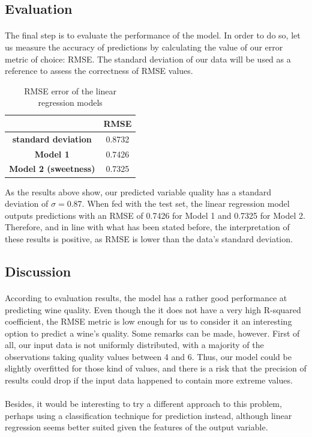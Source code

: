 \documentclass[10pt]{article}
\begin{document}
\subsection{Evaluation}

\paragraph*{}
The final step is to evaluate the performance of the model. In order to do so, let us measure the accuracy of predictions by calculating the value of our error metric of choice: RMSE. The standard deviation of our data will be used as a reference to assess the correctness of RMSE values.

\begin{table}[H]
	\centering
	
	\begin{tabular}{|c|c|}
		\hline
		& \textbf{RMSE} \\ \hline
		\textbf{standard deviation} & 0.8732        \\ \hline
		\textbf{Model 1}            & 0.7426         \\ \hline
		\textbf{Model 2 (sweetness)}            & 0.7325         \\ \hline
	\end{tabular}
	\caption{RMSE error of the linear regression models}
	\label{rmsel}
\end{table}


As the results above show, our predicted variable quality has a standard deviation of $\sigma = 0.87$. When fed with the test set, the linear regression model outputs predictions with an
RMSE of 0.7426 for Model 1 and 0.7325 for Model 2. Therefore, and in line with what has been stated before, the interpretation of these results is positive, as RMSE is lower than the data’s standard deviation.

\subsection{Discussion}

\paragraph*{}
According to evaluation results, the model has a rather good performance at predicting wine quality. Even though the it does not have a very high R-squared coefficient, the RMSE metric is low enough for us to consider it an interesting option to predict a wine's quality. Some remarks can be made, however. First of all, our input data is not uniformly distributed, with a majority of the observations taking quality values between 4 and 6. Thus, our model could be slightly overfitted for those kind of values, and there is a risk that the precision of results could drop if the input data happened to contain more extreme values. 

\paragraph*{}
Besides, it would be interesting to try a different approach to this problem, perhaps using a classification technique for prediction instead, although linear regression seems better suited given the features of the output variable. 
\end{document}
